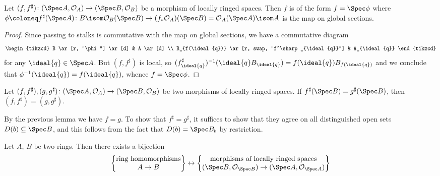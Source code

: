 \documentclass[wip, algebra]{bsteffan-lecturenotes}
\newcommand{\cO}{\mathcal{O}}
\begin{document}
\begin{lemma}
	Let $(f, f^\sharp)\colon (\Spec A, \cO_A) \to (\Spec B, \cO_B)$ be a morphism of locally ringed spaces.
	Then $f$ is of the form $f = \Spec \phi$ where $\phi \coloneq f^\sharp(\Spec A)\colon B \isom \cO_B(\Spec B) \to (f_* \cO_A)(\Spec B) = \cO_A(\Spec A) \isom A$ is the map on global sections.
\end{lemma}
\begin{proof}
	Since passing to stalks is commutative with the map on global sections, we have a commutative diagram
	\begin{equation*}
		\begin{tikzcd}
			B
					\ar[r, "\phi"]
					\ar[d]
				& A
					\ar[d]
			\\
			B_{f(\ideal{q})}
					\ar[r, swap, "f^\sharp_{\ideal{q}}"]
				& A_{\ideal{q}}
		\end{tikzcd}
	\end{equation*}
	for any $\ideal{q} \in \Spec A$.
	But $(f, f^\sharp)$ is local, so $(f^\sharp_{\ideal{q}})^{-1}(\ideal{q} B_{\ideal{q}}) = f(\ideal{q}) B_{f(\ideal{q})}$ and we conclude that $\phi^{-1}(\ideal{q}) = f(\ideal{q})$, whence $f = \Spec \phi$.
\end{proof}
\begin{corollary}
	Let $(f, f^\sharp), (g, g^\sharp)\colon (\Spec A, \cO_A) \to (\Spec B, \cO_B)$ be two morphisms of locally ringed spaces.
	If $f^\sharp(\Spec B) = g^\sharp(\Spec B)$, then $(f, f^\sharp) = (g, g^\sharp)$.
\end{corollary}
\begin{solution}
	By the previous lemma we have $f = g$.
	To show that $f^\sharp = g^\sharp$, it suffices to show that they agree on all distinguished open sets $D(b) \subseteq \Spec B$, and this follows from the fact that $D(b) = \Spec B_b$ by restriction.
\end{solution}
\begin{proposition}\label{prp:sch:morphbij}
	Let $A$, $B$ be two rings.
	Then there exists a bijection
	\begin{equation*}
		\begin{Bmatrix}
			\text{ring homomorphisms} \\
			A \to B
		\end{Bmatrix}
		\leftrightarrow
		\begin{Bmatrix}
			\text{morphisms of locally ringed spaces} \\
			(\Spec B, \cO_{\Spec B}) \to (\Spec A, \cO_{\Spec A})
		\end{Bmatrix}
	\end{equation*}
\end{proposition}
\end{document}
